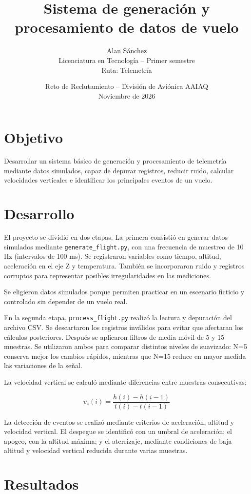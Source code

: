 \documentclass[10pt]{article}
\title{\textbf{Sistema de generación y procesamiento de datos de vuelo}}
\author{Alan Sánchez\\
Licenciatura en Tecnología -- Primer semestre\\
Ruta: Telemetría}
\date{Reto de Reclutamiento -- División de Aviónica AAIAQ\\
Noviembre de 2026}
\begin{document}
\maketitle

\section{Objetivo}

Desarrollar un sistema básico de generación y procesamiento de telemetría mediante datos simulados, capaz de depurar registros, reducir ruido, calcular velocidades verticales e identificar los principales eventos de un vuelo.

\section{Desarrollo}

El proyecto se dividió en dos etapas. La primera consistió en generar datos simulados mediante \texttt{generate\_flight.py}, con una frecuencia de muestreo de 10 Hz (intervalos de 100 ms). Se registraron variables como tiempo, altitud, aceleración en el eje Z y temperatura. También se incorporaron ruido y registros corruptos para representar posibles irregularidades en las mediciones.

Se eligieron datos simulados porque permiten practicar en un escenario ficticio y controlado sin depender de un vuelo real.

En la segunda etapa, \texttt{process\_flight.py} realizó la lectura y depuración del archivo CSV. Se descartaron los registros inválidos para evitar que afectaran los cálculos posteriores. Después se aplicaron filtros de media móvil de 5 y 15 muestras. Se utilizaron ambos para comparar distintos niveles de suavizado: N=5 conserva mejor los cambios rápidos, mientras que N=15 reduce en mayor medida las variaciones de la señal.

La velocidad vertical se calculó mediante diferencias entre muestras consecutivas:

\[
v_z(i)=\frac{h(i)-h(i-1)}{t(i)-t(i-1)}
\]

La detección de eventos se realizó mediante criterios de aceleración, altitud y velocidad vertical. El despegue se identificó con un umbral de aceleración; el apogeo, con la altitud máxima; y el aterrizaje, mediante condiciones de baja altitud y velocidad vertical reducida durante varias muestras.

\newpage

\section{Resultados}
\end{document}
